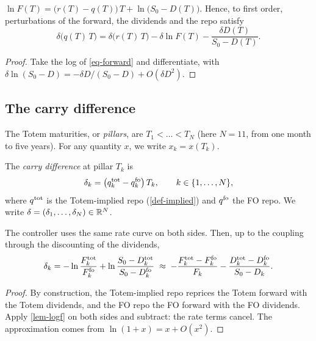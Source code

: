 \begin{lemma}\label{lem-logf}
$\ln F(T)=\bigl(r(T)-q(T)\bigr)\,T+\ln\bigl(S_0-D(T)\bigr)$. Hence, to first order, perturbations of the forward, the
dividends and the repo satisfy
\begin{equation}\label{eq-additivity}
\delta\bigl(q(T)\,T\bigr)=\delta\bigl(r(T)\,T\bigr)-\delta\ln F(T)-\frac{\delta D(T)}{S_0-D(T)} .
\end{equation}
\end{lemma}
\begin{proof}
Take the log of \eqref{eq-forward} and differentiate, with $\delta\ln(S_0-D)=-\delta D/(S_0-D)+O(\delta D^2)$.
\end{proof}

\subsection{The carry difference}
The Totem maturities, or \emph{pillars}, are $T_1<\dots<T_N$ (here $N=11$, from one month to five years). For any
quantity $x$, we write $x_k=x(T_k)$.

\begin{definition}\label{def-delta}
The \emph{carry difference} at pillar $T_k$ is
\begin{equation}\label{eq-delta}
\delta_k=\bigl(q^{\mathrm{tot}}_k-q^{\mathrm{fo}}_k\bigr)\,T_k, \qquad k\in\{1,\dots,N\},
\end{equation}
where $q^{\mathrm{tot}}$ is the Totem-implied repo (\cref{def-implied}) and $q^{\mathrm{fo}}$ the FO repo. We write
$\delta=(\delta_1, \dots, \delta_N)\in\mathbb{R}^N$.
\end{definition}

\begin{proposition}\label{prop-delta}
The controller uses the same rate curve on both sides. Then, up to the coupling through the discounting of the
dividends,
\begin{equation}\label{eq-delta-exact}
\delta_k=-\ln\frac{F^{\mathrm{tot}}_k}{F^{\mathrm{fo}}_k}+\ln\frac{S_0-D^{\mathrm{tot}}_k}{S_0-D^{\mathrm{fo}}_k}
\;\approx\;-\frac{F^{\mathrm{tot}}_k-F^{\mathrm{fo}}_k}{F_k}-\frac{D^{\mathrm{tot}}_k-D^{\mathrm{fo}}_k}{S_0-D_k} .
\end{equation}
\end{proposition}
\begin{proof}
By construction, the Totem-implied repo reprices the Totem forward with the Totem dividends, and the FO repo the FO
forward with the FO dividends. Apply \cref{lem-logf} on both sides and subtract: the rate terms cancel. The
approximation comes from $\ln(1+x)=x+O(x^2)$.
\end{proof}

